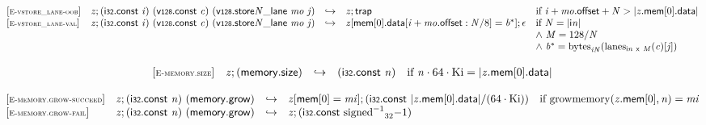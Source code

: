 \vspace{1ex}

$$
\begin{array}{@{}l@{}lcl@{}l@{}}
{[\textsc{\scriptsize E{-}vstore\_lane{-}oob}]} \quad & {\mathit{z}} ; (\mathsf{i{\scriptstyle32}}.\mathsf{const}~{\mathit{i}})~(\mathsf{v{\scriptstyle128}}.\mathsf{const}~{\mathit{c}})~({{{\mathsf{v{\scriptstyle128}.store}}{{\mathit{N}}}}{\mathsf{\_}}}{\mathsf{lane}}~{\mathit{mo}}~{\mathit{j}}) &\hookrightarrow& {\mathit{z}} ; \mathsf{trap} &\quad
  \mbox{if}~{\mathit{i}} + {\mathit{mo}}.\mathsf{offset} + {\mathit{N}} > {|{{\mathit{z}}.\mathsf{mem}}{{}[0]}.\mathsf{data}|} \\
{[\textsc{\scriptsize E{-}vstore\_lane{-}val}]} \quad & {\mathit{z}} ; (\mathsf{i{\scriptstyle32}}.\mathsf{const}~{\mathit{i}})~(\mathsf{v{\scriptstyle128}}.\mathsf{const}~{\mathit{c}})~({{{\mathsf{v{\scriptstyle128}.store}}{{\mathit{N}}}}{\mathsf{\_}}}{\mathsf{lane}}~{\mathit{mo}}~{\mathit{j}}) &\hookrightarrow& {\mathit{z}}{}[\mathsf{mem}{}[0].\mathsf{data}{}[{\mathit{i}} + {\mathit{mo}}.\mathsf{offset} : {\mathit{N}} / 8] = {{\mathit{b}}^\ast}] ; \epsilon &\quad
  \mbox{if}~{\mathit{N}} = {|{\mathsf{i}}{{\mathit{n}}}|} \\
 &&&&\quad {\land}~{\mathit{M}} = 128 / {\mathit{N}} \\
 &&&&\quad {\land}~{{\mathit{b}}^\ast} = {{\mathrm{bytes}}}_{{{\mathit{i}}}{{\mathit{N}}}}({{\mathrm{lanes}}}_{{\mathsf{i}}{{\mathit{n}}}~\mathsf{x}~{\mathit{M}}}({\mathit{c}}){}[{\mathit{j}}]) \\
\end{array}
$$

\vspace{1ex}

$$
\begin{array}{@{}l@{}lcl@{}l@{}}
{[\textsc{\scriptsize E{-}memory.size}]} \quad & {\mathit{z}} ; (\mathsf{memory.size}) &\hookrightarrow& (\mathsf{i{\scriptstyle32}}.\mathsf{const}~{\mathit{n}}) &\quad
  \mbox{if}~{\mathit{n}} \cdot 64 \cdot {\mathrm{Ki}} = {|{{\mathit{z}}.\mathsf{mem}}{{}[0]}.\mathsf{data}|} \\
\end{array}
$$

\vspace{1ex}

$$
\begin{array}{@{}l@{}lcl@{}l@{}}
{[\textsc{\scriptsize E{-}memory.grow{-}succeed}]} \quad & {\mathit{z}} ; (\mathsf{i{\scriptstyle32}}.\mathsf{const}~{\mathit{n}})~(\mathsf{memory.grow}) &\hookrightarrow& {\mathit{z}}{}[\mathsf{mem}{}[0] = {\mathit{mi}}] ; (\mathsf{i{\scriptstyle32}}.\mathsf{const}~{|{{\mathit{z}}.\mathsf{mem}}{{}[0]}.\mathsf{data}|} / (64 \cdot {\mathrm{Ki}})) &\quad
  \mbox{if}~{\mathrm{growmemory}}({{\mathit{z}}.\mathsf{mem}}{{}[0]}, {\mathit{n}}) = {\mathit{mi}} \\
{[\textsc{\scriptsize E{-}memory.grow{-}fail}]} \quad & {\mathit{z}} ; (\mathsf{i{\scriptstyle32}}.\mathsf{const}~{\mathit{n}})~(\mathsf{memory.grow}) &\hookrightarrow& {\mathit{z}} ; (\mathsf{i{\scriptstyle32}}.\mathsf{const}~{{{{{\mathrm{signed}}^{{-1}}}}{}}_{32}}{{-1}}) &  \\
\end{array}
$$

